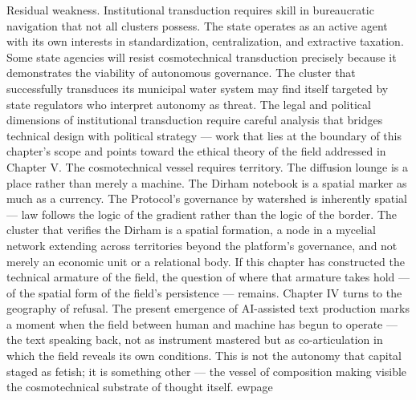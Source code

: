 Residual weakness. Institutional transduction requires skill in bureaucratic navigation that not all clusters possess. The state operates as an active agent with its own interests in standardization, centralization, and extractive taxation. Some state agencies will resist cosmotechnical transduction precisely because it demonstrates the viability of autonomous governance. The cluster that successfully transduces its municipal water system may find itself targeted by state regulators who interpret autonomy as threat. The legal and political dimensions of institutional transduction require careful analysis that bridges technical design with political strategy — work that lies at the boundary of this chapter’s scope and points toward the ethical theory of the field addressed in Chapter V. The cosmotechnical vessel requires territory. The diffusion lounge is a place rather than merely a machine. The Dirham notebook is a spatial marker as much as a currency. The  Protocol’s governance by watershed is inherently spatial — law follows the logic of the gradient rather than the logic of the border. The cluster that verifies the Dirham is a spatial formation, a node in a mycelial network extending across territories beyond the platform’s governance, and not merely an economic unit or a relational body. If this chapter has constructed the technical armature of the field, the question of where that armature takes hold — of the spatial form of the field’s persistence — remains. Chapter IV turns to the geography of refusal. The present emergence of AI-assisted text production marks a moment when the field between human and machine has begun to operate — the text speaking back, not as instrument mastered but as co-articulation in which the field reveals its own conditions. This is not the autonomy that capital staged as fetish; it is something other — the vessel of composition making visible the cosmotechnical substrate of thought itself. ewpage
